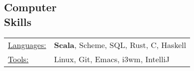 \documentclass[margin]{res}
\begin{document}
\begin{resume}
\section{Computer \\ Skills}
   \begin{tabular}{l p{3in}}
    \underline{Languages:} & {\bf Scala}, Scheme, SQL, Rust, C, Haskell \\
    \underline{Tools:} & Linux, Git, Emacs, i3wm, IntelliJ
   \end{tabular}

\end{resume} 
\end{document}
